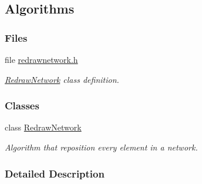 \hypertarget{group___algorithms}{}\subsection{Algorithms}
\label{group___algorithms}
\subsubsection*{Files}
\begin{DoxyCompactItemize}
\item 
file \hyperlink{redrawnetwork_8h}{redrawnetwork.\+h}
\begin{DoxyCompactList}\small\item\em \hyperlink{class_redraw_network}{Redraw\+Network} class definition. \end{DoxyCompactList}\end{DoxyCompactItemize}
\subsubsection*{Classes}
\begin{DoxyCompactItemize}
\item 
class \hyperlink{class_redraw_network}{Redraw\+Network}
\begin{DoxyCompactList}\small\item\em Algorithm that reposition every element in a network. \end{DoxyCompactList}\end{DoxyCompactItemize}


\subsubsection{Detailed Description}
